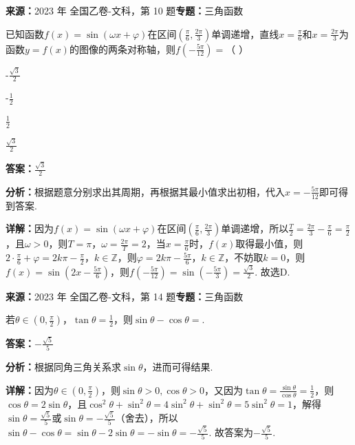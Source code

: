 \begin{question}[points=5]
\textbf{来源：}2023 年 全国乙卷-文科，第 10 题\quad \textbf{专题：}三角函数\par
已知函数$f(x)=\sin(\omega x+\varphi)$在区间$(\frac{\pi}{6},\frac{2\pi}{3})$单调递增，直线$x=\frac{\pi}{6}$和$x=\frac{2\pi}{3}$为函数$y=f(x)$的图像的两条对称轴，则$f(-\frac{5\pi}{12})=$（   ）
\begin{choices}
  \item -$\frac{\sqrt{3}}{2}$
  \item -$\frac{1}{2}$
  \item $\frac{1}{2}$
  \item $\frac{\sqrt{3}}{2}$
\end{choices}
\begin{solution}
\textbf{答案：}$\frac{\sqrt{3}}{2}$

\textbf{分析：}根据题意分别求出其周期，再根据其最小值求出初相，代入$x=-\frac{5\pi}{12}$即可得到答案.

\textbf{详解：}因为$f(x)=\sin(\omega x+\varphi)$在区间$(\frac{\pi}{6},\frac{2\pi}{3})$单调递增，所以$\frac{T}{2}=\frac{2\pi}{3}-\frac{\pi}{6}=\frac{\pi}{2}$，且$\omega>0$，则$T=\pi$，$\omega=\frac{2\pi}{T}=2$，当$x=\frac{\pi}{6}$时，$f(x)$取得最小值，则$2\cdot\frac{\pi}{6}+\varphi=2k\pi-\frac{\pi}{2}$，$k\in \mathbb{Z}$，则$\varphi=2k\pi-\frac{5\pi}{6}$，$k\in \mathbb{Z}$，不妨取$k=0$，则$f(x)=\sin(2x-\frac{5\pi}{6})$，则$f(-\frac{5\pi}{12})=\sin(-\frac{5\pi}{3})=\frac{\sqrt{3}}{2}$. 故选D.
\end{solution}
\end{question}

\begin{question}[points=5]
\textbf{来源：}2023 年 全国乙卷-文科，第 14 题\quad \textbf{专题：}三角函数\par
若$\theta\in(0,\frac{\pi}{2})$，$\tan\theta=\frac{1}{2}$，则$\sin\theta-\cos\theta=$.
\begin{solution}
\textbf{答案：}$-\frac{\sqrt{5}}{5}$

\textbf{分析：}根据同角三角关系求$\sin\theta$，进而可得结果.

\textbf{详解：}因为$\theta\in(0,\frac{\pi}{2})$，则$\sin\theta>0, \cos\theta>0$，又因为$\tan\theta=\frac{\sin\theta}{\cos\theta}=\frac{1}{2}$，则$\cos\theta=2\sin\theta$，且$\cos^2\theta+\sin^2\theta=4\sin^2\theta+\sin^2\theta=5\sin^2\theta=1$，解得$\sin\theta=\frac{\sqrt{5}}{5}$或$\sin\theta=-\frac{\sqrt{5}}{5}$（舍去），所以$\sin\theta-\cos\theta=\sin\theta-2\sin\theta=-\sin\theta=-\frac{\sqrt{5}}{5}$. 故答案为$-\frac{\sqrt{5}}{5}$.
\end{solution}
\end{question}

